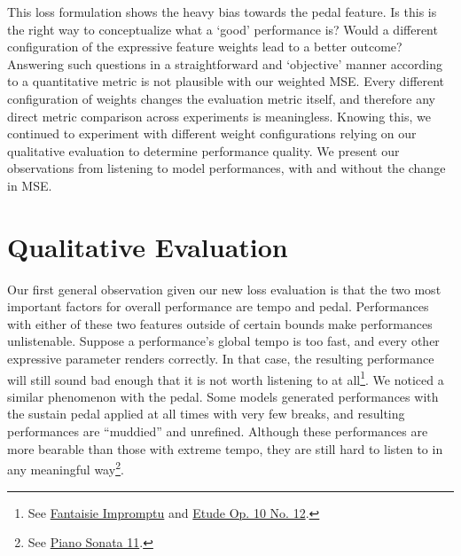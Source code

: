 This loss formulation shows the heavy bias towards the pedal feature. Is this is the right way to conceptualize what a `good' performance is? Would a different configuration of the expressive feature weights lead to a better outcome? Answering such questions in a straightforward and `objective' manner according to a quantitative metric is not plausible with our weighted MSE. Every different configuration of weights changes the evaluation metric itself, and therefore any direct metric comparison across experiments is meaningless. Knowing this, we continued to experiment with different weight configurations relying on our qualitative evaluation to determine performance quality. We present our observations from listening to model performances, with and without the change in MSE. 



\section{Qualitative Evaluation}\label{sec:qualitative-analysis}
Our first general observation given our new loss evaluation is that the two most important factors for overall performance are tempo and pedal. Performances with either of these two features outside of certain bounds make performances unlistenable. Suppose a performance's global tempo is too fast, and every other expressive parameter renders correctly. In that case, the resulting performance will still sound bad enough that it is not worth listening to at all\footnote%
{See \href{https://ui.neptune.ai/richt3211/thesis/e/THESIS-86/artifacts}{ Fantaisie Impromptu} and \href{https://ui.neptune.ai/richt3211/thesis/e/THESIS-126/artifacts}{ Etude Op. 10 No. 12}.}. We noticed a similar phenomenon with the pedal. Some models generated performances with the sustain pedal applied at all times with very few breaks, and resulting performances are ``muddied'' and unrefined. Although these performances are more bearable than those with extreme tempo, they are still hard to listen to in any meaningful way\footnote{See \href{https://ui.neptune.ai/richt3211/thesis/e/THESIS-125/artifacts}{ Piano Sonata 11}.}. 

